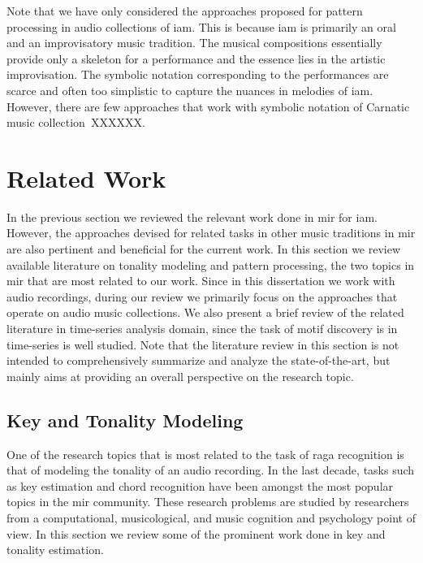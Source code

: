 {Note that we have only considered the approaches proposed for pattern processing in audio collections of \gls{iam}. This is because \gls{iam} is primarily an oral and an improvisatory music tradition. The musical compositions essentially provide only a skeleton for a performance and the essence lies in the artistic improvisation. The symbolic notation corresponding to the performances are scarce and often too simplistic to capture the nuances in melodies of \gls{iam}. However, there are few approaches that work with symbolic notation of Carnatic music collection~XXXXXX. 


\section{Related Work}
\label{sec:background_relevant_work_other_music}

In the previous section we reviewed the relevant work done in \gls{mir} for \gls{iam}. However, the approaches devised for related tasks in other music traditions in \gls{mir} are also pertinent and beneficial for the current work. In this section we review available literature on tonality modeling and pattern processing, the two topics in \gls{mir} that are most related to our work. Since in this dissertation we work with audio recordings, during our review we primarily focus on the approaches that operate on audio music collections. We also present a brief review of the related literature in time-series analysis domain, since the task of motif discovery is in time-series is well studied. Note that the literature review in this section is not intended to comprehensively summarize and analyze the state-of-the-art, but mainly aims at providing an overall perspective on the research topic.


\subsection{Key and Tonality Modeling}
\label{sec:background_key_and_tonality_modeling}


One of the research topics that is most related to the task of \gls{raga} recognition is that of modeling the tonality of an audio recording. In the last decade, tasks such as key estimation and chord recognition have been amongst the most popular topics in the \gls{mir} community. These research problems are studied by researchers from a computational, musicological, and music cognition and psychology point of view. In this section we review some of the prominent work done in key and tonality estimation. 

}
